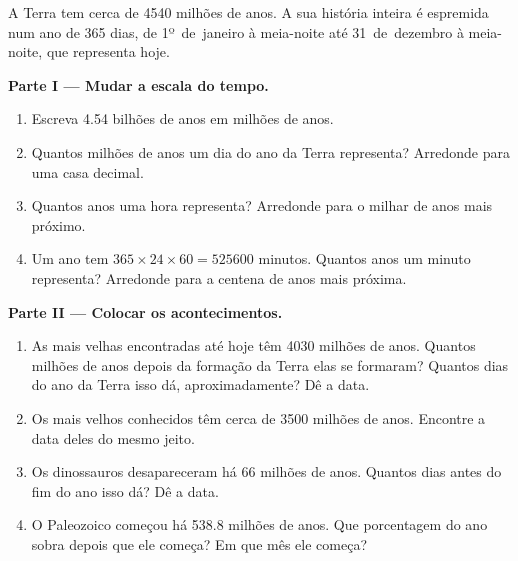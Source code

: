 \begin{problem}
\label{pb:g7:geological-time:1}
A Terra tem cerca de \num{4540} milhões de anos. A sua história inteira é
espremida num ano de 365 dias, de 1º~de~janeiro à meia-noite até
31~de~dezembro à meia-noite, que representa hoje.

\medskip
\noindent\textbf{Parte I --- Mudar a escala do tempo.}\par\nopagebreak
\begin{enumerate}[beginpenalty=10000]
  \item Escreva \num{4.54} bilhões de anos em milhões de anos.
  \item Quantos milhões de anos um dia do ano da Terra representa?
        Arredonde para uma casa decimal.
  \item Quantos anos uma hora representa? Arredonde para o milhar de
        anos mais próximo.
  \item Um ano tem $365 \times 24 \times 60 = \num{525600}$ minutos.
        Quantos anos um minuto representa? Arredonde para a centena de
        anos mais próxima.
\end{enumerate}

\medskip
\noindent\textbf{Parte II --- Colocar os acontecimentos.}\par\nopagebreak
\begin{enumerate}[resume, beginpenalty=10000]
  \item As  mais velhas encontradas até hoje têm \num{4030} milhões
        de anos. Quantos milhões de anos depois da formação da Terra elas
        se formaram? Quantos dias do ano da Terra isso dá, aproximadamente?
        Dê a data.
  \item Os  mais velhos conhecidos têm cerca de \num{3500} milhões
        de anos. Encontre a data deles do mesmo jeito.
  \item Os dinossauros desapareceram há \num{66} milhões de anos. Quantos
        dias antes do fim do ano isso dá? Dê a data.
  \item O Paleozoico começou há \num{538.8} milhões de anos. Que
        porcentagem do ano sobra depois que ele começa? Em que mês ele
        começa?
\end{enumerate}


\end{problem}
